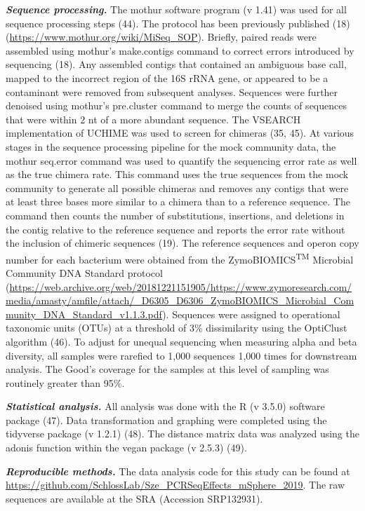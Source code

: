 \documentclass[11,]{article}
\begin{document}
\textbf{\emph{Sequence processing.}} The mothur software program (v
1.41) was used for all sequence processing steps (44). The protocol has
been previously published (18)
(\url{https://www.mothur.org/wiki/MiSeq_SOP}). Briefly, paired reads
were assembled using mothur's make.contigs command to correct errors
introduced by sequencing (18). Any assembled contigs that contained an
ambiguous base call, mapped to the incorrect region of the 16S rRNA
gene, or appeared to be a contaminant were removed from subsequent
analyses. Sequences were further denoised using mothur's pre.cluster
command to merge the counts of sequences that were within 2 nt of a more
abundant sequence. The VSEARCH implementation of UCHIME was used to
screen for chimeras (35, 45). At various stages in the sequence
processing pipeline for the mock community data, the mothur seq.error
command was used to quantify the sequencing error rate as well as the
true chimera rate. This command uses the true sequences from the mock
community to generate all possible chimeras and removes any contigs that
were at least three bases more similar to a chimera than to a reference
sequence. The command then counts the number of substitutions,
insertions, and deletions in the contig relative to the reference
sequence and reports the error rate without the inclusion of chimeric
sequences (19). The reference sequences and operon copy number for each
bacterium were obtained from the ZymoBIOMICS\textsuperscript{TM}
Microbial Community DNA Standard protocol
(\url{https://web.archive.org/web/20181221151905/https://www.zymoresearch.com/media/amasty/amfile/attach/_D6305_D6306_ZymoBIOMICS_Microbial_Community_DNA_Standard_v1.1.3.pdf}).
Sequences were assigned to operational taxonomic units (OTUs) at a
threshold of 3\% dissimilarity using the OptiClust algorithm (46). To
adjust for unequal sequencing when measuring alpha and beta diversity,
all samples were rarefied to 1,000 sequences 1,000 times for downstream
analysis. The Good's coverage for the samples at this level of sampling
was routinely greater than 95\%.

\textbf{\emph{Statistical analysis.}} All analysis was done with the R
(v 3.5.0) software package (47). Data transformation and graphing were
completed using the tidyverse package (v 1.2.1) (48). The distance
matrix data was analyzed using the adonis function within the vegan
package (v 2.5.3) (49).

\textbf{\emph{Reproducible methods.}} The data analysis code for this
study can be found at
\url{https://github.com/SchlossLab/Sze_PCRSeqEffects_mSphere_2019}. The
raw sequences are available at the SRA (Accession SRP132931).
\end{document}
